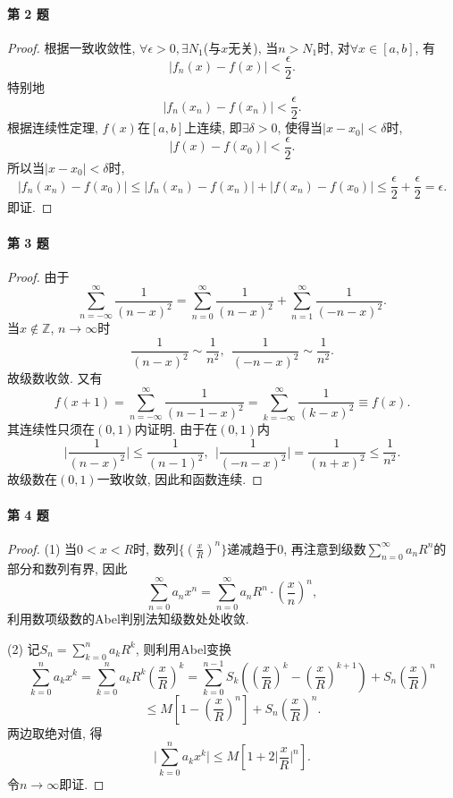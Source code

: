 \documentclass[UTF8,11pt, a4paper, oneside, fontset=none]{ctexbook}
\begin{document}
\paragraph{第 2 题}
\begin{proof}

根据一致收敛性, $\forall \epsilon >0, \exists N_1$(与$x$无关), 当$n >N_1$时, 对$\forall x \in [a, b]$, 有
\[
|f_n(x) - f(x)| < \frac{\epsilon}{2}.
\]
特别地
\[
|f_n(x_n) - f(x_n)| < \frac{\epsilon}{2}.
\]
根据连续性定理, $f(x)$在$[a, b]$上连续, 即$\exists \delta > 0$, 使得当$|x - x_0| < \delta$时,
\[
|f(x) - f(x_0)| < \frac{\epsilon}{2}.
\]
所以当$|x - x_0| < \delta$时,
\[
|f_n(x_n) - f(x_0)| \leq |f_n(x_n) - f(x_n)| + |f(x_n) - f(x_0)| \leq \frac{\epsilon}{2} + \frac{\epsilon}{2} = \epsilon.
\]
即证.

\end{proof}

\paragraph{第 3 题}
\begin{proof}

由于
\[
\sum_{n=-\infty}^{\infty} \frac{1}{(n-x)^2} = \sum_{n=0}^{\infty} \frac{1}{(n-x)^2} + \sum_{n=1}^{\infty} \frac{1}{(-n-x)^2}.
\]
当$x \notin \mathbb Z$, $n \to \infty$时
\[
\frac{1}{(n-x)^2} \sim \frac{1}{n^2}, \ \  \frac{1}{(-n-x)^2} \sim \frac{1}{n^2}.
\]
故级数收敛. 又有
\[
f(x+1) = \sum_{n=-\infty}^{\infty} \frac{1}{(n-1-x)^2}  = \sum_{k=-\infty}^{\infty} \frac{1}{(k-x)^2} \equiv f(x). 
\]
其连续性只须在$(0, 1)$内证明. 由于在$(0, 1)$内
\[
\Big| \frac{1}{(n-x)^2} \Big| \leq \frac{1}{(n-1)^2},  \ \ \Big| \frac{1}{(-n-x)^2} \Big| = \frac{1}{(n+x)^2} \leq \frac{1}{n^2}.
\]
故级数在$(0, 1)$一致收敛, 因此和函数连续.

\end{proof}

\paragraph{第 4 题}
\begin{proof}

(1) 当$0 < x < R$时, 数列$\{ \left( \frac{x}{R} \right)^n \}$递减趋于0, 再注意到级数$\sum_{n=0}^{\infty} a_n R^n$的部分和数列有界, 因此
\[
\sum_{n=0}^{\infty} a_n x^n = \sum_{n=0}^{\infty} a_n R^n \cdot \left( \frac{x}{n} \right)^n,
\]
利用数项级数的Abel判别法知级数处处收敛.

(2) 记$S_n = \sum_{k=0}^n a_k R^k$, 则利用Abel变换
\[
\sum_{k=0}^n a_k x^k = \sum_{k=0}^n a_k R^k \left( \frac{x}{R} \right)^k = \sum_{k=0}^{n-1} S_k \left( \left( \frac{x}{R} \right)^k - \left( \frac{x}{R} \right)^{k+1} \right) + S_n \left( \frac{x}{R} \right)^n
\]
\[
\leq  M \left[ 1 -  \left( \frac{x}{R} \right)^n \right] + S_n \left( \frac{x}{R} \right)^n.
\]
两边取绝对值, 得
\[
\Big| \sum_{k=0}^n a_k x^k \Big| \leq M \left[ 1 + 2 \Big| \frac{x}{R} \Big|^n \right].
\]
令$n \to \infty$即证.

\end{proof}
\end{document}
